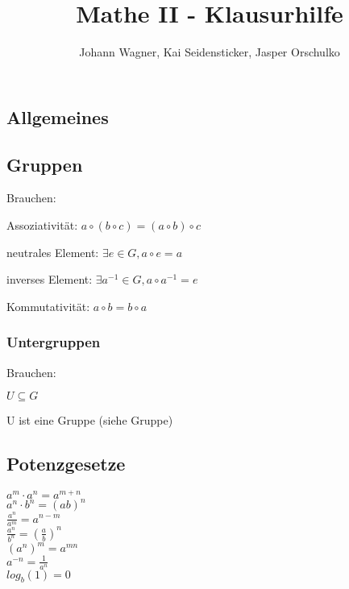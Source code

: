 \documentclass[a4paper,landscape, 11pt]{article}
\author{Johann Wagner, Kai Seidensticker, Jasper Orschulko}
\title{Mathe II - Klausurhilfe}
\begin{document}
    \begin{multicols}{5}
    \begin{small}
    \section{Allgemeines}
    	\subsection{Gruppen}
    	Brauchen:
    	
    	\begin{compactitem}
    		\item {Assoziativität: $a\circ(b\circ c)=(a\circ b)\circ c$}
    		\item {neutrales Element: $\exists e\in G, a\circ e=a$}
    		\item {inverses Element: $\exists a^{-1}\in G, a\circ a^{-1}=e$}
    		\item {Kommutativität: $a\circ b=b\circ a$}
    	\end{compactitem}
    	\subsubsection{Untergruppen}
    	Brauchen:
    	
    	\begin{compactitem}   		
    		\item {$U\subseteq G$}
    		\item {U ist eine Gruppe (siehe Gruppe)}
    	\end{compactitem}
        \subsection{Potenzgesetze}
            \begin{multicols}{2}
            $a^m \cdot a^n = a^{m+n}$\\
            $a^n \cdot b^n = (ab)^n$\\
            $\frac{a^n}{a^m} = a^{n-m}$\\
            $\frac{a^n}{b^n} = \left(\frac{a}{b}\right)^n$\\
            $(a^n)^m = a^{mn}$\\
            $a^{-n} = \frac{1}{a^n}$\\
            $log_b(1) = 0$
            \end{multicols}

\end{small}
\end{multicols}
\end{document}
